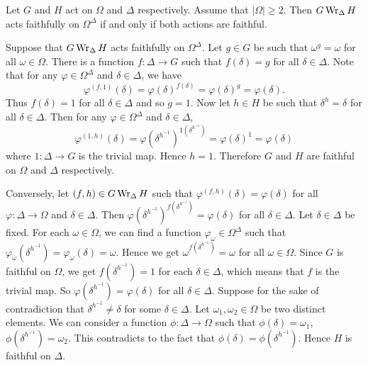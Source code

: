 \begin{proposition}
	Let $G$ and $H$ act on $\Omega$ and $\Delta$ respectively. Assume that $|\Omega|\geq 2$. Then $G\operatorname{Wr}_\Delta H$ acts faithfully on $\Omega^\Delta$ if and only if both actions are faithful. 
\end{proposition}
\begin{sketch}
	Suppose that $G\operatorname{Wr}_\Delta H$ acts faithfully on $\Omega^\Delta$. Let $g\in G$ be such that $\omega^g =\omega$ for all $\omega\in\Omega$. There is a function $f:\Delta\to G$ such that $f(\delta) = g$ for all $\delta\in\Delta$. Note that for any $\varphi\in \Omega^\Delta$ and $\delta\in \Delta$, we have
	\begin{equation*}
		\varphi^{(f,1)}(\delta) = \varphi(\delta)^{f(\delta)} = \varphi(\delta)^g = \varphi(\delta).
	\end{equation*}
	Thus $f(\delta) = 1$ for all $\delta\in\Delta$ and so $g = 1$. Now let $h\in H$ be such that $\delta^h = \delta$ for all $\delta\in\Delta$. Then for  any $\varphi\in \Omega^\Delta$ and $\delta\in \Delta$, 
	\begin{equation*}
		\varphi^{(1,h)}(\delta) = \varphi(\delta^{h^{-1}})^{1(\delta^{h^{-1}})} = \varphi(\delta)^1 = \varphi(\delta)
	\end{equation*}
	where $1:\Delta\to G$ is the trivial map. Hence $h=1$. Therefore $G$ and $H$ are faithful on $\Omega$ and $\Delta$ respectively.
	
	Conversely, let $(f,h)\in G\operatorname{Wr}_{\Delta} H$ such that $\varphi^{(f,h)}(\delta) = \varphi(\delta)$ for all $\varphi:\Delta\to \Omega$ and $\delta\in \Delta$. Then $
		\varphi(\delta^{h^{-1}})^{f(\delta^{h^{-1}})} = \varphi(\delta)$ for all $\delta\in \Delta$. Let $\delta\in\Delta$ be fixed. For each $\omega\in \Omega$, we can find a function $\varphi_\omega\in \Omega^\Delta$ such that  $\varphi_\omega(\delta^{h^{-1}}) =\varphi_\omega(\delta) = \omega$. Hence we get $\omega^{f(\delta^{h^{-1}})} = \omega$ for all $\omega\in \Omega$. Since $G$ is faithful on $\Omega$, we get $f(\delta^{h^{-1}}) = 1$ for each $\delta\in \Delta$, which means that $f$ is the trivial map. So $\varphi(\delta^{h^{-1}}) = \varphi(\delta)$ for all $\delta\in \Delta$. Suppose for the sake of contradiction that $\delta^{h^{-1}}\neq \delta$ for some $\delta\in\Delta$. Let $\omega_1,\omega_2\in \Omega$ be two distinct elements. We can consider a function $\phi:\Delta\to \Omega$ such that $\phi(\delta) = \omega_1$, $\phi(\delta^{h^{-1}}) = \omega_2$. This contradicts to the fact that $\phi(\delta) = \phi(\delta^{h^{-1}})$. Hence $H$ is faithful on $\Delta$.
\end{sketch}
